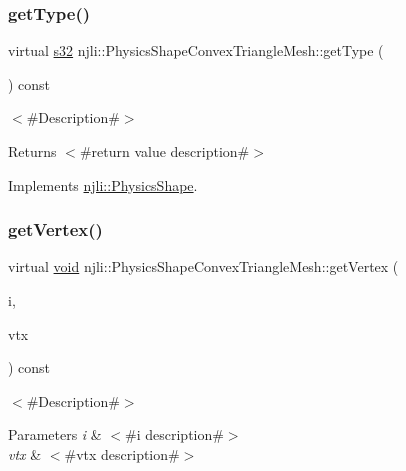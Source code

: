 \subsubsection{\texorpdfstring{get\+Type()}{getType()}}
{\footnotesize\ttfamily virtual \mbox{\hyperlink{_util_8h_aa62c75d314a0d1f37f79c4b73b2292e2}{s32}} njli\+::\+Physics\+Shape\+Convex\+Triangle\+Mesh\+::get\+Type (\begin{DoxyParamCaption}{ }\end{DoxyParamCaption}) const\hspace{0.3cm}{\ttfamily [virtual]}}

$<$\#\+Description\#$>$

\begin{DoxyReturn}{Returns}
$<$\#return value description\#$>$ 
\end{DoxyReturn}


Implements \mbox{\hyperlink{classnjli_1_1_physics_shape_ac7c6b2ac373892095f8220d56f8ad6de}{njli\+::\+Physics\+Shape}}.

\mbox{\label{classnjli_1_1_physics_shape_convex_triangle_mesh_a53a05210663e07ec01a0882110b9ea56}} 
\subsubsection{\texorpdfstring{get\+Vertex()}{getVertex()}}
{\footnotesize\ttfamily virtual \mbox{\hyperlink{_thread_8h_af1e856da2e658414cb2456cb6f7ebc66}{void}} njli\+::\+Physics\+Shape\+Convex\+Triangle\+Mesh\+::get\+Vertex (\begin{DoxyParamCaption}\item[{int}]{i,  }\item[{bt\+Vector3 \&}]{vtx }\end{DoxyParamCaption}) const\hspace{0.3cm}{\ttfamily [virtual]}}

$<$\#\+Description\#$>$


\begin{DoxyParams}{Parameters}
{\em i} & $<$\#i description\#$>$ \\
\hline
{\em vtx} & $<$\#vtx description\#$>$ \\
\hline
\end{DoxyParams}


